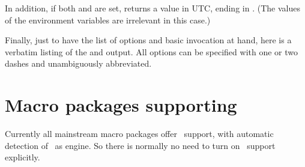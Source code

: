 \documentclass{pdftexmanual}
\begin{document}
In addition, if both  and
 are set,  returns a value
in UTC, ending in . (The values of the environment variables are
irrelevant in this case.)

Finally, just to have the list of options and basic invocation at hand,
here is a verbatim listing of the  and 
output. All options can be specified with one or two dashes and
unambiguously abbreviated.


\section{Macro packages supporting \PDFTEX}

Currently all mainstream macro packages offer \PDFTEX\ support, with
automatic detection of \PDFTEX\ as engine. So there is normally no need
to turn on \PDFTEX\ support explicitly.
\end{document}
